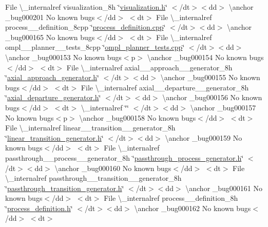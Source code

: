 \begin{DoxyRefList}
\+File \textbackslash{}\+\_\+internalref visualization\+\_\+8h \char`\"{}\mbox{\hyperlink{visualization_8h}{visualization.\+h}}\char`\"{} $<$/dt$>$$<$dd$>$ \textbackslash{}anchor \+\_\+bug000201 No known bugs$<$/dd$>$ $<$dt$>$
\+File \textbackslash{}\+\_\+internalref process\+\_\+\+\_\+definition\+\_\+8cpp \char`\"{}\mbox{\hyperlink{process__definition_8cpp}{process\+\_\+definition.\+cpp}}\char`\"{} $<$/dt$>$$<$dd$>$ \textbackslash{}anchor \+\_\+bug000165 No known bugs$<$/dd$>$ $<$dt$>$
\+File \textbackslash{}\+\_\+internalref ompl\+\_\+\+\_\+planner\+\_\+\+\_\+tests\+\_\+8cpp \char`\"{}\mbox{\hyperlink{ompl__planner__tests_8cpp}{ompl\+\_\+planner\+\_\+tests.\+cpp}}\char`\"{} $<$/dt$>$$<$dd$>$ \textbackslash{}anchor \+\_\+bug000153 No known bugs$<$p$>$ \textbackslash{}anchor \+\_\+bug000154 No known bugs$<$/dd$>$ $<$dt$>$
\+File \textbackslash{}\+\_\+internalref axial\+\_\+\+\_\+approach\+\_\+\+\_\+generator\+\_\+8h \char`\"{}\mbox{\hyperlink{axial__approach__generator_8h}{axial\+\_\+approach\+\_\+generator.\+h}}\char`\"{} $<$/dt$>$$<$dd$>$ \textbackslash{}anchor \+\_\+bug000155 No known bugs$<$/dd$>$ $<$dt$>$
\+File \textbackslash{}\+\_\+internalref axial\+\_\+\+\_\+departure\+\_\+\+\_\+generator\+\_\+8h \char`\"{}\mbox{\hyperlink{axial__departure__generator_8h}{axial\+\_\+departure\+\_\+generator.\+h}}\char`\"{} $<$/dt$>$$<$dd$>$ \textbackslash{}anchor \+\_\+bug000156 No known bugs$<$/dd$>$ $<$dt$>$
 \textbackslash{}\+\_\+internalref  \char`\"{}\char`\"{} $<$/dt$>$$<$dd$>$ \textbackslash{}anchor \+\_\+bug000157 No known bugs$<$p$>$ \textbackslash{}anchor \+\_\+bug000158 No known bugs$<$/dd$>$ $<$dt$>$
\+File \textbackslash{}\+\_\+internalref linear\+\_\+\+\_\+transition\+\_\+\+\_\+generator\+\_\+8h \char`\"{}\mbox{\hyperlink{linear__transition__generator_8h}{linear\+\_\+transition\+\_\+generator.\+h}}\char`\"{} $<$/dt$>$$<$dd$>$ \textbackslash{}anchor \+\_\+bug000159 No known bugs$<$/dd$>$ $<$dt$>$
\+File \textbackslash{}\+\_\+internalref passthrough\+\_\+\+\_\+process\+\_\+\+\_\+generator\+\_\+8h \char`\"{}\mbox{\hyperlink{passthrough__process__generator_8h}{passthrough\+\_\+process\+\_\+generator.\+h}}\char`\"{} $<$/dt$>$$<$dd$>$ \textbackslash{}anchor \+\_\+bug000160 No known bugs$<$/dd$>$ $<$dt$>$
\+File \textbackslash{}\+\_\+internalref passthrough\+\_\+\+\_\+transition\+\_\+\+\_\+generator\+\_\+8h \char`\"{}\mbox{\hyperlink{passthrough__transition__generator_8h}{passthrough\+\_\+transition\+\_\+generator.\+h}}\char`\"{} $<$/dt$>$$<$dd$>$ \textbackslash{}anchor \+\_\+bug000161 No known bugs$<$/dd$>$ $<$dt$>$
\+File \textbackslash{}\+\_\+internalref process\+\_\+\+\_\+definition\+\_\+8h \char`\"{}\mbox{\hyperlink{process__definition_8h}{process\+\_\+definition.\+h}}\char`\"{} $<$/dt$>$$<$dd$>$ \textbackslash{}anchor \+\_\+bug000162 No known bugs$<$/dd$>$ $<$dt$>$

\end{DoxyRefList}
